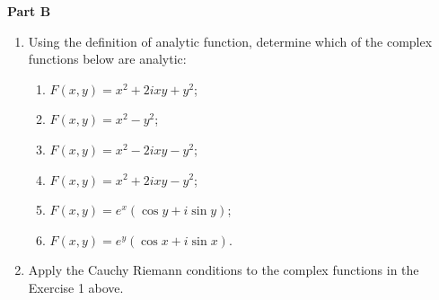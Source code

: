 \documentclass[fleqn]{article}
\begin{document}
  \textbf{Part B}
  \begin{enumerate}

    \item Using the definition of analytic function, determine which of the complex functions below are analytic: 
    
    \begin{enumerate}
      \item $F(x,y)=x^2+2ixy+y^2$;
      \item $F(x,y)=x^2-y^2$;
      \item $F(x,y)=x^2-2ixy-y^2$;
      \item $F(x,y)=x^2+2ixy-y^2$;
      \item $F(x,y)=e^x(\cos y+i \sin y)$;
      \item $F(x,y)=e^y(\cos x+i \sin x)$.
    \end{enumerate}
    
    \item Apply the Cauchy Riemann conditions to the complex functions in the Exercise 1 above.
    
    
  \end{enumerate}
\end{document}

